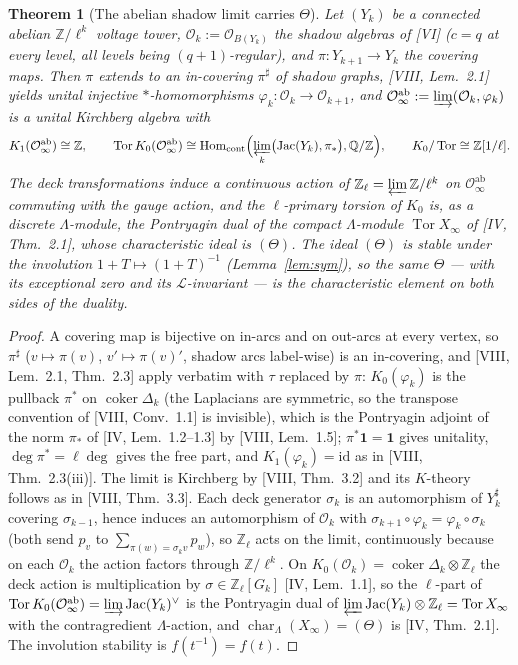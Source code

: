 \documentclass[11pt]{amsart}
\numberwithin{equation}{section}
\newtheorem{theorem}{Theorem}[section]
\theoremstyle{definition}
\theoremstyle{remark}
\newcommand{\Z}{\mathbb{Z}}
\newcommand{\Q}{\mathbb{Q}}
\newcommand{\Zl}{\Z_\ell}
\newcommand{\La}{\Lambda}
\newcommand{\cO}{\mathcal{O}}
\newcommand{\cL}{\mathcal{L}}
\newcommand{\Jac}{\operatorname{Jac}}
\newcommand{\coker}{\operatorname{coker}}
\newcommand{\Tor}{\operatorname{Tor}}
\newcommand{\Hom}{\operatorname{Hom}}
\newcommand{\car}{\operatorname{char}_{\La}}
\begin{document}
\begin{theorem}[The abelian shadow limit carries $\Theta$]\label{thm:shadow}
Let $(Y_k)$ be a connected abelian $\Z/\ell^{k}$ voltage tower, $\cO_k:=\cO_{B(Y_k)}$ the
shadow algebras of {\rm[VI]} ($c=q$ at every level, all levels being $(q{+}1)$-regular),
and $\pi\colon Y_{k+1}\to Y_k$ the covering maps. Then $\pi$ extends to an in-covering
$\pi^{\sharp}$ of shadow graphs, {\rm[VIII, Lem.~2.1]} yields unital injective
$*$-homomorphisms $\varphi_k\colon\cO_k\to\cO_{k+1}$, and
$\cO_\infty^{\mathrm{ab}}:=\varinjlim(\cO_k,\varphi_k)$ is a unital Kirchberg algebra with
\[
K_1(\cO_\infty^{\mathrm{ab}})\cong\Z,\qquad
\Tor K_0(\cO_\infty^{\mathrm{ab}})\cong\Hom_{\mathrm{cont}}\Bigl(\varprojlim_k\bigl(\Jac(Y_k),\pi_*\bigr),\Q/\Z\Bigr),
\qquad K_0/\Tor\cong\Z[1/\ell].
\]
The deck transformations induce a continuous action of $\Zl=\varprojlim\Z/\ell^{k}$ on
$\cO_\infty^{\mathrm{ab}}$ commuting with the gauge action, and the $\ell$-primary torsion
of $K_0$ is, as a discrete $\La$-module, the Pontryagin dual of the compact $\La$-module
$\Tor X_\infty$ of {\rm[IV, Thm.~2.1]}, whose characteristic ideal is $(\Theta)$. The
ideal $(\Theta)$ is stable under the involution $1+T\mapsto(1+T)^{-1}$
(Lemma~\ref{lem:sym}), so the same $\Theta$ --- with its exceptional zero and its
$\cL$-invariant --- is the characteristic element on both sides of the duality.
\end{theorem}

\begin{proof}
A covering map is bijective on in-arcs and on out-arcs at every vertex, so
$\pi^{\sharp}$ ($v\mapsto\pi(v)$, $v'\mapsto\pi(v)'$, shadow arcs label-wise) is an
in-covering, and [VIII, Lem.~2.1, Thm.~2.3] apply verbatim with $\tau$ replaced by
$\pi$: $K_0(\varphi_k)$ is the pullback $\pi^{*}$ on $\coker\Delta_k$ (the Laplacians
are symmetric, so the transpose convention of [VIII, Conv.~1.1] is invisible), which is
the Pontryagin adjoint of the norm $\pi_*$ of [IV, Lem.~1.2--1.3] by
[VIII, Lem.~1.5]; $\pi^{*}\mathbf1=\mathbf1$ gives unitality, $\deg\pi^{*}=\ell\deg$
gives the free part, and $K_1(\varphi_k)=\mathrm{id}$ as in [VIII, Thm.~2.3(iii)]. The
limit is Kirchberg by [VIII, Thm.~3.2] and its $K$-theory follows as in
[VIII, Thm.~3.3]. Each deck generator $\sigma_k$ is an automorphism of $Y_k^{\sharp}$
covering $\sigma_{k-1}$, hence induces an automorphism of $\cO_k$ with
$\sigma_{k+1}\circ\varphi_k=\varphi_k\circ\sigma_k$ (both send $p_v$ to
$\sum_{\pi(w)=\sigma_kv}p_w$), so $\Zl$ acts on the limit, continuously because on each
$\cO_k$ the action factors through $\Z/\ell^{k}$. On $K_0(\cO_k)=\coker\Delta_k\otimes\Zl$
the deck action is multiplication by $\sigma\in\Zl[G_k]$ [IV, Lem.~1.1], so the
$\ell$-part of $\Tor K_0(\cO_\infty^{\mathrm{ab}})=\varinjlim\Jac(Y_k)^{\vee}$ is the
Pontryagin dual of $\varprojlim\Jac(Y_k)\otimes\Zl=\Tor X_\infty$ with the
contragredient $\La$-action, and $\car(X_\infty)=(\Theta)$ is [IV, Thm.~2.1]. The
involution stability is $f(t^{-1})=f(t)$.
\end{proof}
\end{document}
